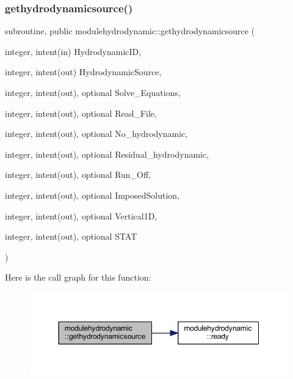 \subsubsection{\texorpdfstring{gethydrodynamicsource()}{gethydrodynamicsource()}}
{\footnotesize\ttfamily subroutine, public modulehydrodynamic\+::gethydrodynamicsource (\begin{DoxyParamCaption}\item[{integer, intent(in)}]{Hydrodynamic\+ID,  }\item[{integer, intent(out)}]{Hydrodynamic\+Source,  }\item[{integer, intent(out), optional}]{Solve\+\_\+\+Equations,  }\item[{integer, intent(out), optional}]{Read\+\_\+\+File,  }\item[{integer, intent(out), optional}]{No\+\_\+hydrodynamic,  }\item[{integer, intent(out), optional}]{Residual\+\_\+hydrodynamic,  }\item[{integer, intent(out), optional}]{Run\+\_\+\+Off,  }\item[{integer, intent(out), optional}]{Imposed\+Solution,  }\item[{integer, intent(out), optional}]{Vertical1D,  }\item[{integer, intent(out), optional}]{S\+T\+AT }\end{DoxyParamCaption})}

Here is the call graph for this function\+:\nopagebreak
\begin{figure}[H]
\begin{center}
\leavevmode
\includegraphics[width=350pt]{namespacemodulehydrodynamic_ab585744f4ba5d5552dabea7edb88d98b_cgraph}
\end{center}
\end{figure}
\mbox{\label{namespacemodulehydrodynamic_a391b4f9e43b2d5d986bedc666b00da4d}} 
